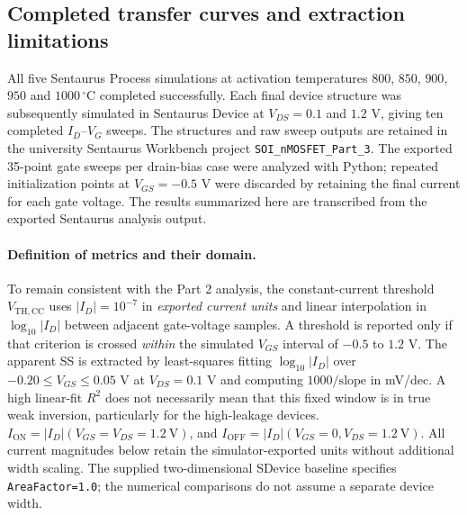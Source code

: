 \subsection{Completed transfer curves and extraction limitations}
All five Sentaurus Process simulations at activation temperatures
$800$, $850$, $900$, $950$ and $1000\,^\circ$C completed
successfully. Each final device structure was subsequently simulated
in Sentaurus Device at $V_{DS}=0.1$ and $1.2$ V, giving ten
completed $I_D$--$V_G$ sweeps. The structures and raw sweep outputs
are retained in the university Sentaurus Workbench project
\texttt{SOI\_nMOSFET\_Part\_3}. The exported 35-point gate sweeps per
drain-bias case were analyzed with Python; repeated initialization
points at $V_{GS}=-0.5$ V were discarded by retaining the final
current for each gate voltage. The results summarized here are
transcribed from the exported Sentaurus analysis output.

\paragraph{Definition of metrics and their domain.}
To remain consistent with the Part 2 analysis, the
constant-current threshold $V_{\mathrm{TH,CC}}$ uses
$|I_D|=10^{-7}$ in \emph{exported current units} and linear
interpolation in $\log_{10}|I_D|$ between adjacent gate-voltage
samples. A threshold is reported only if that criterion is crossed
\emph{within} the simulated $V_{GS}$ interval of $-0.5$ to $1.2$ V.
The apparent SS is extracted by least-squares fitting
$\log_{10}|I_D|$ over $-0.20\le V_{GS}\le0.05$ V at
$V_{DS}=0.1$ V and computing $1000/\mathrm{slope}$ in mV/dec.
A high linear-fit $R^2$ does not necessarily mean that this
fixed window is in true weak inversion, particularly for the
high-leakage devices.
$I_{\mathrm{ON}}=|I_D|(V_{GS}=V_{DS}=1.2\ \mathrm V)$,
and $I_{\mathrm{OFF}}=|I_D|(V_{GS}=0,V_{DS}=1.2\ \mathrm V)$.
All current magnitudes below retain the simulator-exported units
without additional width scaling. The supplied two-dimensional
SDevice baseline specifies \texttt{AreaFactor=1.0}; the numerical
comparisons do not assume a separate device width.

